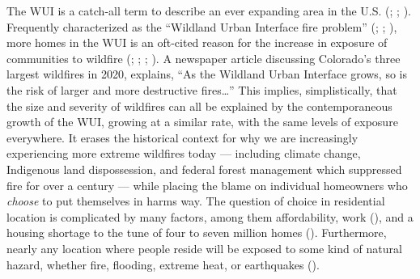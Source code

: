 \documentclass[
]{article}
\begin{document}
The WUI is a catch-all term to describe an ever expanding area in the U.S. (; ; ). Frequently characterized as the ``Wildland Urban Interface fire problem'' (; ; ), more homes in the WUI is an oft-cited reason for the increase in exposure of communities to wildfire (; ; ; ). A newspaper article discussing Colorado's three largest wildfires in 2020, explains, ``As the Wildland Urban Interface grows, so is the risk of larger and more destructive fires\ldots{}'' This implies, simplistically, that the size and severity of wildfires can all be explained by the contemporaneous growth of the WUI, growing at a similar rate, with the same levels of exposure everywhere. It erases the historical context for why we are increasingly experiencing more extreme wildfires today --- including climate change, Indigenous land dispossession, and federal forest management which suppressed fire for over a century --- while placing the blame on individual homeowners who \emph{choose} to put themselves in harms way. The question of choice in residential location is complicated by many factors, among them affordability, work (), and a housing shortage to the tune of four to seven million homes (). Furthermore, nearly any location where people reside will be exposed to some kind of natural hazard, whether fire, flooding, extreme heat, or earthquakes ().
\end{document}
